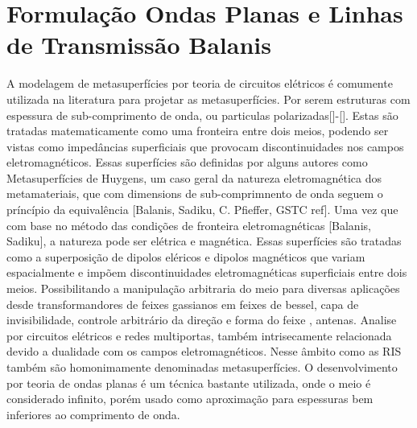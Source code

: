 \documentclass[
	12pt,				%
	openright,			%
	oneside,			%
	a4papey79r,			%
	english,			%
	brazil				%
	]{abntex2}
\begin{document}
\chapter{Formulação Ondas Planas e Linhas de Transmissão Balanis }\label{FormulaçãoPWTLBalanis}

A modelagem de metasuperfícies por teoria de circuitos elétricos é comumente utilizada na literatura para projetar as metasuperfícies. Por serem estruturas com espessura de sub-comprimento de onda, ou particulas polarizadas[]-[]. Estas são tratadas matematicamente como uma fronteira entre dois meios, podendo ser vistas como impedâncias superficiais que provocam discontinuidades nos campos eletromagnéticos. Essas superfícies são definidas por alguns autores como Metasuperfícies de Huygens, um caso geral da natureza eletromagnética dos metamateriais, que com dimensions de sub-comprimnento de onda seguem o príncípio da equivalência  [Balanis, Sadiku, C. Pfieffer, GSTC ref]. Uma vez que com base no método das condições de fronteira eletromagnéticas [Balanis, Sadiku], a natureza pode ser elétrica e magnética. Essas superfícies são tratadas como a superposição de dipolos eléricos e dipolos magnéticos que variam espacialmente e impõem discontinuidades eletromagnéticas superficiais entre dois meios. Possibilitando a manipulação arbitraria do meio para diversas aplicações desde transformandores de feixes gassianos em feixes de bessel, capa de invisibilidade, controle arbitrário da direção e forma do feixe , antenas. Analise por circuitos elétricos e redes multiportas, também intrisecamente relacionada devido a dualidade com os campos eletromagnéticos.
Nesse âmbito como as RIS também são homonimamente denominadas metasuperfícies. O desenvolvimento por teoria de ondas planas é um técnica bastante utilizada, onde o meio é considerado infinito, porém usado como aproximação para espessuras bem inferiores ao comprimento de onda.
\end{document}
